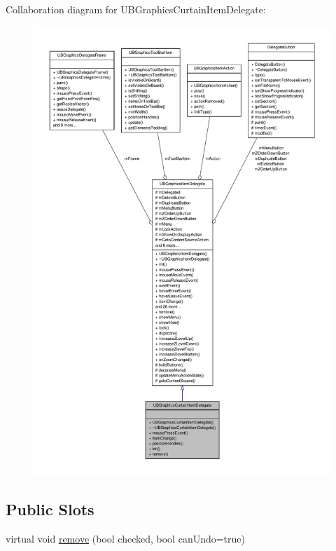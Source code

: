 Collaboration diagram for U\-B\-Graphics\-Curtain\-Item\-Delegate\-:
\nopagebreak
\begin{figure}[H]
\begin{center}
\leavevmode
\includegraphics[width=350pt]{d8/d68/class_u_b_graphics_curtain_item_delegate__coll__graph}
\end{center}
\end{figure}
\subsection*{Public Slots}
\begin{DoxyCompactItemize}
\item 
virtual void \hyperlink{class_u_b_graphics_curtain_item_delegate_a70f461a59877cb88d900d39d3862c20d}{remove} (bool checked, bool can\-Undo=true)
\end{DoxyCompactItemize}
